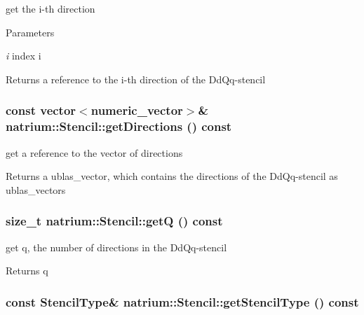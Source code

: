 get the i-\/th direction 
\begin{DoxyParams}{Parameters}
\item[{\em i}]index i \end{DoxyParams}
\begin{DoxyReturn}{Returns}
a reference to the i-\/th direction of the DdQq-\/stencil 
\end{DoxyReturn}
\hypertarget{classnatrium_1_1Stencil_a02dbfdb70b94a32f477a6ac57ed14f5e}{
\subsubsection[{getDirections}]{\setlength{\rightskip}{0pt plus 5cm}const vector$<$numeric\_\-vector$>$\& natrium::Stencil::getDirections () const}}
\label{classnatrium_1_1Stencil_a02dbfdb70b94a32f477a6ac57ed14f5e}


get a reference to the vector of directions \begin{DoxyReturn}{Returns}
a ublas\_\-vector, which contains the directions of the DdQq-\/stencil as ublas\_\-vectors 
\end{DoxyReturn}
\hypertarget{classnatrium_1_1Stencil_a9c42c1e1fbc5308a8ba1281eb5e4be18}{
\subsubsection[{getQ}]{\setlength{\rightskip}{0pt plus 5cm}size\_\-t natrium::Stencil::getQ () const}}
\label{classnatrium_1_1Stencil_a9c42c1e1fbc5308a8ba1281eb5e4be18}


get q, the number of directions in the DdQq-\/stencil \begin{DoxyReturn}{Returns}
q 
\end{DoxyReturn}
\hypertarget{classnatrium_1_1Stencil_af4dbee6d83d5d749f02f771633d54db2}{
\subsubsection[{getStencilType}]{\setlength{\rightskip}{0pt plus 5cm}const StencilType\& natrium::Stencil::getStencilType () const}}
\label{classnatrium_1_1Stencil_af4dbee6d83d5d749f02f771633d54db2}


